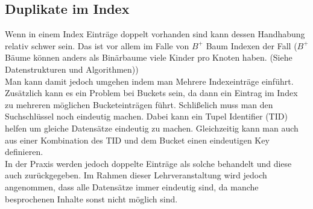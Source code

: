 \documentclass{article}
\begin{document}
	\subsection{Duplikate im Index}
	Wenn in einem Index Einträge doppelt vorhanden sind kann dessen Handhabung relativ schwer sein. Das ist vor allem im Falle von $B^+$ Baum Indexen der Fall ($B^+$ Bäume können anders als Binärbaume viele Kinder pro Knoten haben. (Siehe Datenstrukturen und Algorithmen)) \\
	Man kann damit jedoch umgehen indem man Mehrere Indexeinträge einführt. Zusätzlich kann es ein Problem bei Buckets sein, da dann ein Eintrag im Index zu mehreren möglichen Bucketeinträgen führt. Schlißelich muss man den Suchschlüssel noch eindeutig machen. Dabei kann ein Tupel Identifier (TID) helfen um gleiche Datensätze eindeutig zu machen. Gleichzeitig kann man auch aus einer Kombination des TID und dem Bucket einen eindeutigen Key definieren. \\
	In der Praxis werden jedoch doppelte Einträge als solche behandelt und diese auch zurückgegeben. Im Rahmen dieser Lehrveranstaltung wird jedoch angenommen, dass alle Datensätze immer eindeutig sind, da manche besprochenen Inhalte sonst nicht möglich sind.













	
\end{document}
